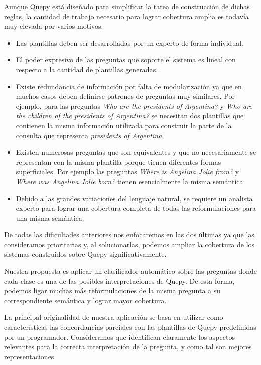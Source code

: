 Aunque Quepy está diseñado para simplificar la tarea de construcción de dichas reglas, la cantidad de trabajo necesario para lograr cobertura amplia es todavía muy elevada por varios motivos:
\begin{itemize}
    \item Las plantillas deben ser desarrolladas por un experto de forma individual.
    \item El poder expresivo de las preguntas que soporte el sistema es lineal con respecto a la cantidad de plantillas generadas.
    \item Existe redundancia de información por falta de modularización ya que en muchos casos deben definirse patrones de preguntas muy similares. Por ejemplo, para las preguntas \textit{Who are the presidents of Argentina?} y \textit{Who are the children of the presidents of Argentina?} se necesitan dos plantillas que contienen la misma información utilizada para construir la parte de la consulta que representa \textit{presidents of Argentina}.
    \item Existen numerosas preguntas que son equivalentes y que no necesariamente se representan con la misma plantilla porque tienen diferentes formas superficiales. Por ejemplo las preguntas \textit{Where is Angelina Jolie from?} y \textit{Where was Angelina Jolie born?} tienen esencialmente la misma semántica.
    \item Debido a las grandes variaciones del lenguaje natural, se requiere un analista experto para lograr una cobertura completa de todas las reformulaciones para una misma semántica.
\end{itemize}

De todas las dificultades anteriores nos enfocaremos en las dos últimas ya que las consideramos prioritarias y, al solucionarlas, podemos ampliar la cobertura de los sistemas construidos sobre Quepy significativamente.

Nuestra propuesta es aplicar un clasificador automático sobre las preguntas donde cada clase es una de las posibles interpretaciones de Quepy. De esta forma, podemos ligar muchas más reformulaciones de la misma pregunta a su correspondiente semántica y lograr mayor cobertura.

La principal originalidad de nuestra aplicación se basa en utilizar como características las concordancias parciales con las plantillas de Quepy predefinidas por un programador. Consideramos que identifican claramente los aspectos relevantes para la correcta interpretación de la pregunta, y como tal son mejores representaciones.

